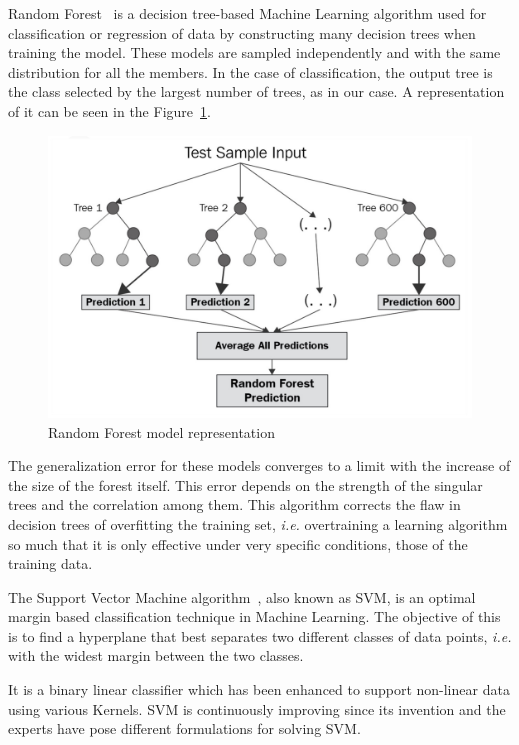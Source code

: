 Random Forest~\cite{breiman2001random} is a decision tree-based Machine Learning algorithm used for classification or regression of data by constructing many decision trees when training the model. These models are sampled independently and with the same distribution for all the members. In the case of classification, the output tree is the class selected by the largest number of trees, as in our case. A representation of it can be seen in the Figure~\ref{fig:random-forest}.

\begin{figure}[!htp]
    \centering
    \includegraphics[scale=0.3]{img/detection/random-forest.jpg}
    \caption{Random Forest model representation}
    \label{fig:random-forest}
\end{figure}

The generalization error for these models converges to a limit with the increase of the size of the forest itself. This error depends on the strength of the singular trees and the correlation among them. This algorithm corrects the flaw in decision trees of overfitting the training set, \textit{i.e.} overtraining a learning algorithm so much that it is only effective under very specific conditions, those of the training data.

The Support Vector Machine algorithm~\cite{chauhan2019problem}, also known as SVM, is an optimal margin based classification technique in Machine Learning. The objective of this is to find a hyperplane that best separates two different classes of data points,\textit{ i.e.} with the widest margin between the two classes. 

It is a binary linear classifier which has been enhanced to support non-linear data using various Kernels. SVM is continuously improving since its invention and the experts have pose different formulations for solving SVM. 

